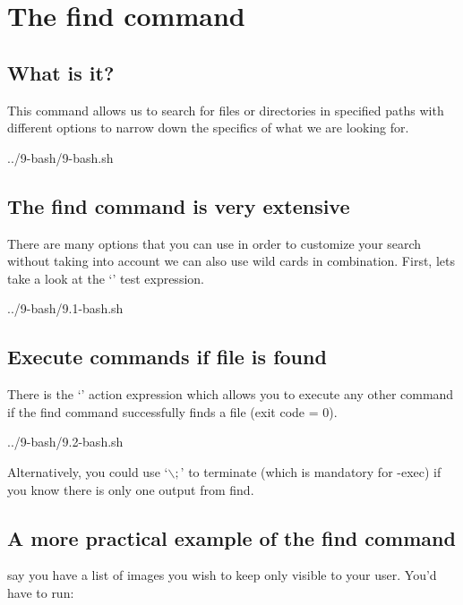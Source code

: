 \chapter{The find command}

\section{What is it?}

This command allows us to search for files or directories in specified paths with different options to narrow down
the specifics of what we are looking for.


{../9-bash/9-bash.sh}

\section{The find command is very extensive}

There are many options that you can use in order to customize your search without taking into account 
we can also use wild cards in combination. First, lets take a look at the `' test expression.


{../9-bash/9.1-bash.sh}
\pagebreak
\section{Execute commands if file is found}

There is the `' action expression which allows you to execute any other command if the
find command successfully finds a file (exit code = 0).


{../9-bash/9.2-bash.sh}

Alternatively, you could use `$\backslash;$' to terminate (which is mandatory for -exec) if you know there
is only one output from find.

\section{A more practical example of the find command}

say you have a list of images you wish to keep only visible to your user. You'd have to run:

